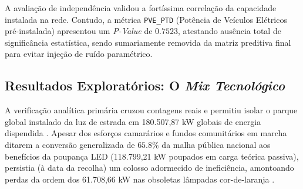 \documentclass[conference]{IEEEtran}
\begin{document}
\begin{table}[htbp]
\centering
\caption{Testes de Independência e Seleção de Features (Spearman \& ANOVA)}
\label{tab:independencia}
\end{table}

A avaliação de independência validou a fortíssima correlação da capacidade instalada na rede. Contudo, a métrica \texttt{PVE\_PTD} (Potência de Veículos Elétricos pré-instalada) apresentou um \textit{P-Value} de $0.7523$, atestando ausência total de significância estatística, sendo sumariamente removida da matriz preditiva final para evitar injeção de ruído paramétrico.

\subsection{Resultados Exploratórios: O \textit{Mix Tecnológico}}
A verificação analítica primária cruzou contagens reais e permitiu isolar o parque global instalado da luz de estrada em 180.507,87 kW globais de energia dispendida \cite{b4}. Apesar dos esforços camarários e fundos comunitários em marcha ditarem a conversão generalizada de $65.8\%$ da malha pública nacional aos benefícios da poupança LED (118.799,21 kW poupados em carga teórica passiva), persistia (à data da recolha) um colosso adormecido de ineficiência, amontoando perdas da ordem dos 61.708,66 kW nas obsoletas lâmpadas cor-de-laranja \cite{b3}. 
\end{document}
